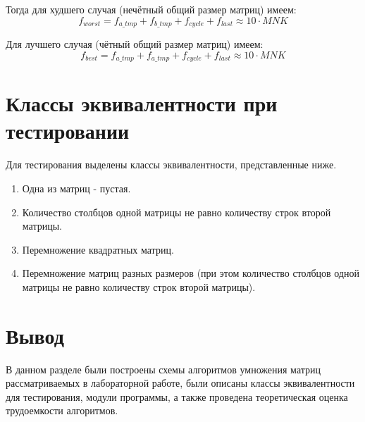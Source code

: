Тогда для худшего случая (нечётный общий размер матриц) имеем:
\begin{equation}
	\label{for:bad_impr}
	f_{worst} =  f_{a\_tmp} + f_{b\_tmp} + f_{cycle} + f_{last}\approx 10 \cdot MNK
\end{equation}

Для лучшего случая (чётный общий размер матриц) имеем:
\begin{equation}
	\label{for:good_impr}
	f_{best} =  f_{a\_tmp} + f_{a\_tmp} + f_{cycle} + f_{last} \approx 10 \cdot MNK
\end{equation}



\section[Классы эквивалентности при тестировании]{Классы эквивалентности при\\тестировании}

Для тестирования выделены классы эквивалентности, представленные ниже.

\begin{enumerate}
	\item Одна из матриц - пустая.
	\item Количество столбцов одной матрицы не равно количеству строк второй матрицы.
	\item Перемножение квадратных матриц.
	\item Перемножение матриц разных размеров (при этом количество столбцов одной матрицы не равно количеству строк второй матрицы).
\end{enumerate}


\section{Вывод}

В данном разделе были построены схемы алгоритмов умножения матриц рассматриваемых в лабораторной работе, были описаны классы эквивалентности для тестирования, модули программы, а также проведена теоретическая оценка трудоемкости алгоритмов.
